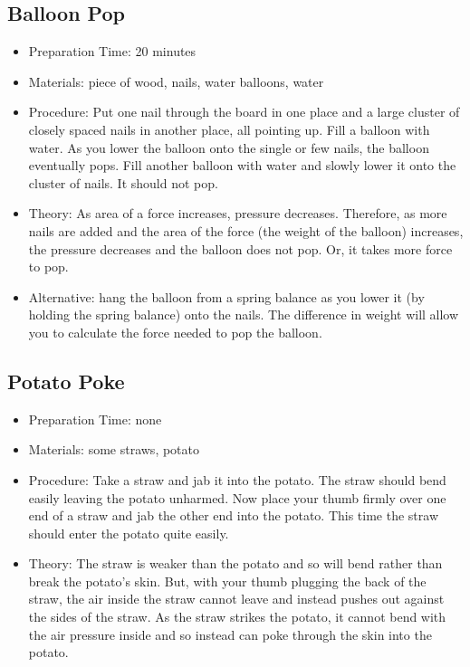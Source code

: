 \subsection{Balloon Pop}
\begin{itemize}
\item{Preparation Time: 20 minutes}
\item{Materials: piece of wood, nails, water balloons, water}
\item{Procedure: Put one nail through the board in one place and a large cluster of closely spaced nails in another place, all pointing up. Fill a balloon with water. As you lower the balloon onto the single or few nails, the balloon eventually pops. Fill another balloon with water and slowly lower it onto the cluster of nails. It should not pop.}
\item{Theory: As area of a force increases, pressure decreases. Therefore, as more nails are added and the area of the force (the weight of the balloon) increases, the pressure decreases and the balloon does not pop. Or, it takes more force to pop.}
\item{Alternative: hang the balloon from a spring balance as you lower it (by holding the spring balance) onto the nails. The difference in weight will allow you to calculate the force needed to pop the balloon.}
\end{itemize}

\subsection{Potato Poke}
\begin{itemize}
\item{Preparation Time: none}
\item{Materials: some straws, potato}
\item{Procedure: Take a straw and jab it into the potato. The straw should bend easily leaving the potato unharmed. Now place your thumb firmly over one end of a straw and jab the other end into the potato. This time the straw should enter the potato quite easily.}
\item{Theory: The straw is weaker than the potato and so will bend rather than break the potato’s skin. But, with your thumb plugging the back of the straw, the air inside the straw cannot leave and instead pushes out against the sides of the straw. As the straw strikes the potato, it cannot bend with the air pressure inside and so instead can poke through the skin into the potato.}
\end{itemize}

